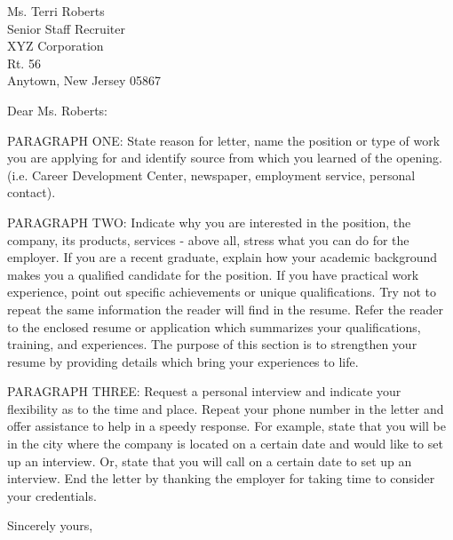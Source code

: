 \documentclass[11pt]{coverletter}
\begin{document}
\begin{coverletter}{Ms. Terri Roberts \\
Senior Staff Recruiter \\
XYZ Corporation \\
Rt. 56 \\
Anytown, New Jersey 05867}{}

\opening{Dear Ms. Roberts:} 
 
PARAGRAPH ONE: State reason for letter, name the position or type 
of work you are applying for and identify source from  which  you 
learned   of   the  opening.  (i.e.  Career  Development  Center, 
newspaper, employment service, personal contact). 
 
PARAGRAPH  TWO:  Indicate why you are interested in the position, 
the company, its products, services - above all, stress what you 
can  do  for  the employer. If you are a recent graduate, explain  how
your academic background makes you a qualified candidate for the
position. If  you have practical work experience, point out 
specific achievements or unique qualifications. Try not to repeat 
the  same  information  the reader will find in the resume. Refer 
the reader to the enclosed resume or application which summarizes 
your  qualifications,  training,  and experiences. The purpose of 
this section is to strengthen your resume  by  providing  details 
which bring your experiences to life. 
 
PARAGRAPH THREE: Request a personal interview and  indicate  your 
flexibility as to the time and place. Repeat your phone number in 
the letter and offer assistance to help in a speedy response. For 
example,  state that you will be in the city where the company is 
located on a certain date and would like to set up an  interview. 
Or,  state  that  you  will  call  on a certain date to set up an 
interview. End the letter by thanking  the  employer  for  taking 
time to consider your credentials. 
 
\closing{Sincerely yours,}

\end{coverletter}
\end{document}
